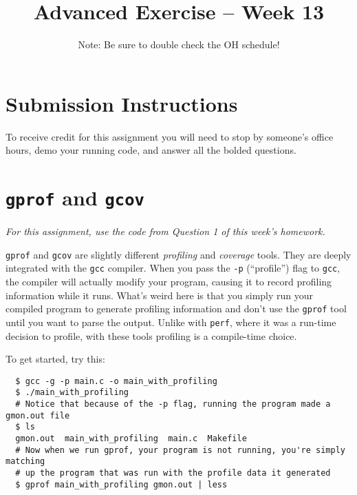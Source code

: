 \documentclass{article}
\begin{document}
\fancyfoot[C]{\color{gray} \thepage~/~\pageref*{LastPage}}
\pagestyle{fancyplain}


\title{\textbf{Advanced Exercise -- Week 13\\}}
\author{\textbf{\color{red}{Due: Before December 17, 10:00PM}}}
\date{Note: Be sure to double check the OH schedule!}
\maketitle


\section*{Submission Instructions}
To receive credit for this assignment you will need to stop by someone's
office hours, demo your running code, and answer all the bolded questions.

\section*{\texttt{gprof} and \texttt{gcov}}

\emph{For this assignment, use the code from Question 1 of this week's
  homework.}

\texttt{gprof} and \texttt{gcov} are slightly different \emph{profiling} and
\emph{coverage} tools. They are deeply integrated with the \texttt{gcc}
compiler. When you pass the \texttt{-p} (``profile'') flag to \texttt{gcc},
the compiler will actually modify your program, causing it to record profiling
information while it runs. What's weird here is that you simply run your
compiled program to generate profiling information and don't use the
\texttt{gprof} tool until you want to parse the output. Unlike with
\texttt{perf}, where it was a run-time decision to profile, with these tools
profiling is a compile-time choice.

To get started, try this:
\begin{verbatim}
  $ gcc -g -p main.c -o main_with_profiling
  $ ./main_with_profiling
  # Notice that because of the -p flag, running the program made a gmon.out file
  $ ls
  gmon.out  main_with_profiling  main.c  Makefile
  # Now when we run gprof, your program is not running, you're simply matching
  # up the program that was run with the profile data it generated
  $ gprof main_with_profiling gmon.out | less
\end{verbatim}
\end{document}
